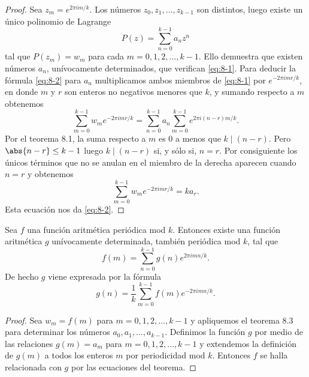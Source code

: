 \documentclass[12pt,a4paper]{book}
\begin{document}
    \begin{proof}
        Sea $z_{m}=e^{2\pi im/k}$. Los números $z_{0},z_{1},\dots,z_{k-1}$ son distintos, luego
        existe un único polinomio de Lagrange
        \begin{equation*}
            P(z)=\sum_{n=0}^{k-1}a_{n}z^{n}
        \end{equation*}
        tal que $P(z_{m})=w_{m}$ para cada $m=0,1,2,\dots,k-1$. Ello demuestra que existen
        números $a_{n}$, unívocamente determinados, que verifican \eqref{eq:8-1}. Para
        deducir la fórmula \eqref{eq:8-2} para $a_{n}$ multiplicamos ambos miembros de
        \eqref{eq:8-1} por $e^{-2\pi imr/k}$, en donde $m$ y $r$ son enteros no negativos
        menores que $k$, y sumando respecto a $m$ obtenemos
        \begin{equation*}
            \sum_{m=0}^{k-1}w_{m}e^{-2\pi imr/k}=\sum_{n=0}^{k-1}a_{n}\sum_{m=0}^{k-1}e^{2\pi i(n-r)m/k}.
        \end{equation*}
        Por el teorema 8.1, la suma respecto a $m$ es 0 a menos que $k\mid(n-r)$. Pero
        $\abs{n-r}\leq k-1$ luego $k\mid(n-r)$ si, y sólo si, $n=r$. Por consiguiente los
        únicos términos que no se anulan en el miembro de la derecha aparecen cuando $n=r$
        y obtenemos
        \begin{equation*}
            \sum_{m=0}^{k-1}w_{m}e^{-2\pi imr/k}=ka_{r}.
        \end{equation*}
        Esta ecuación nos da \eqref{eq:8-2}.
    \end{proof}

    \begin{teorema}
        Sea $f$ una función aritmética periódica mod $k$. Entonces existe una función
        aritmética $g$ unívocamente determinada, también periódica mod $k$, tal que
        \begin{equation*}
            f(m)=\sum_{n=0}^{k-1}g(n)e^{2\pi imn/k}.
        \end{equation*}
        De hecho $g$ viene expresada por la fórmula
        \begin{equation*}
            g(n)=\frac{1}{k}\sum_{m=0}^{k-1}f(m)e^{-2\pi imn/k}.
        \end{equation*}
    \end{teorema}

    \begin{proof}
        Sea $w_{m}=f(m)$ para $m=0,1,2,\dots,k-1$ y apliquemos el teorema 8.3 para determinar
        los números $a_{0},a_{1},\dots,a_{k-1}$. Definimos la función $g$ por medio de las
        relaciones $g(m)=a_{m}$ para $m=0,1,2,\dots,k-1$ y extendemos la definición de $g(m)$
        a todos los enteros $m$ por periodicidad mod $k$. Entonces $f$ se halla
        relacionada con $g$ por las ecuaciones del teorema.
    \end{proof}
\end{document}
